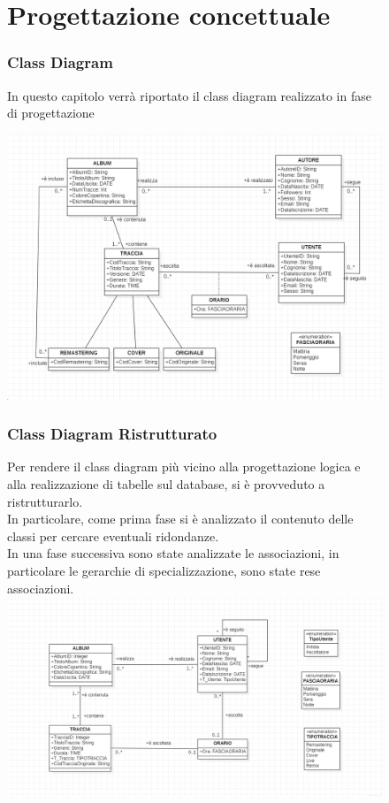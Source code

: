 \documentclass[11pt]{article}
\begin{document}
	\clearpage
	
	\begin{figure}
		\part{Progettazione concettuale}
		\section{Class Diagram}
		In questo capitolo verrà riportato il class diagram realizzato in fase di progettazione 
	
		\includegraphics[scale = 0.5]{SpotifyPezzotto}
	\end{figure}

	\clearpage

	\begin{figure}
		\section{Class Diagram Ristrutturato}
		Per rendere il class diagram più vicino alla progettazione logica e alla realizzazione di 
		tabelle sul database, si è provveduto a ristrutturarlo.\\
		In particolare, come prima fase si è analizzato il contenuto delle classi per cercare 
		eventuali ridondanze.\\
		In una fase successiva sono state analizzate le associazioni, in particolare le gerarchie di specializzazione,
		sono state rese associazioni.\\
		\includegraphics[scale = 0.6]{SpotifyRistrotturato}

	\end{figure}
\end{document}
